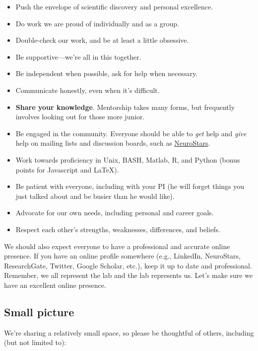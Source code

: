\documentclass[letterpaper,12pt,oneside]{memoir}
\begin{document}
\begin{itemize}
\item Push the envelope of scientific discovery and personal excellence. 
\item Do work we are proud of individually and as a group.
\item Double-check our work, and be at least a little obsessive.
\item Be supportive---we're all in this together.
\item Be independent when possible, ask for help when necessary.
\item Communicate honestly, even when it's difficult.
\item \textbf{Share your knowledge}. Mentorship takes many forms, but frequently involves looking out for those more junior.
\item Be engaged in the community. Everyone should be able to \textit{get} help and \textit{give} help on mailing lists and discussion boards, such as \href{https://neurostars.org}{NeuroStars}.
\item Work towards proficiency in Unix, BASH, Matlab, R, and Python (bonus points for Javascript and \LaTeX).
\item Be patient with everyone, including with your PI (he will forget things you just talked about and be busier than he would like).
\item Advocate for our own needs, including personal and career goals.
\item Respect each other's strengths, weaknesses, differences, and beliefs.
\end{itemize}

We should also expect everyone to have a professional and accurate online presence. If you have an online profile somewhere (e.g., LinkedIn, NeuroStars, ResearchGate, Twitter, Google Scholar, etc.), keep it up to date and professional. Remember, we all represent the lab and the lab represents us. Let's make sure we have an excellent online presence.


\subsection{Small picture}

We're sharing a relatively small space, so please be thoughtful of others, including (but not limited to):
\end{document}
